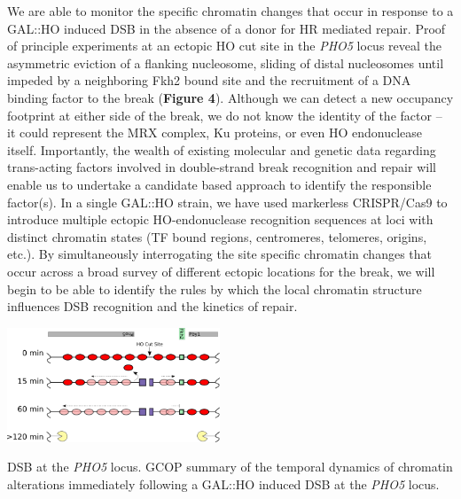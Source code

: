 We are able to monitor the specific chromatin changes that occur in response to a GAL::HO induced DSB in the absence of a donor for HR mediated repair.  Proof of principle experiments at an ectopic HO cut site in the \textit{PHO5} locus reveal the asymmetric eviction of a flanking nucleosome, sliding of distal nucleosomes until impeded by a neighboring Fkh2 bound site and the recruitment of a DNA binding factor to the break ({\color{dukeblue}\textbf{Figure 4}}).  Although we can detect a new occupancy footprint at either side of the  break, we do not know the identity of the factor -- it could represent the MRX complex, Ku proteins, or even HO endonuclease itself. Importantly, the wealth of existing molecular and genetic data regarding trans-acting factors involved in double-strand break recognition and repair %
will enable us to undertake a %
candidate based approach to identify the responsible factor(s). In a single GAL::HO strain, we have used markerless CRISPR/Cas9\citep{Anand2017-dp} to introduce multiple ectopic HO-endonuclease recognition sequences at loci with distinct chromatin states (TF bound regions, centromeres, telomeres, origins, etc.). By simultaneously interrogating the site specific chromatin changes that occur across a broad survey of different ectopic locations for the break, we will begin to be able to identify the rules by which the local chromatin structure influences DSB recognition and the kinetics of repair.
\begin{floatingfigure}[r]{2.5in}
\vspace{-4mm}
\begin{center}
\includegraphics[width=2.5in]{r35_figures/cut_process.png}
\end{center}
\vspace{4mm}
\caption{DSB at the \textit{PHO5} locus. GCOP summary of the temporal dynamics of chromatin alterations immediately following a GAL::HO induced DSB at the \textit{PHO5} locus. }%
\end{floatingfigure}


